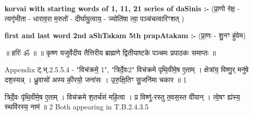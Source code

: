 \documentclass[17pt]{extarticle}
\begin{document}
        \textbf{korvai with starting words of 1, 11, 21 series of daSinis :-} \newline
        (प्रा॒णो र॑क्ष॒ - त्यगृ॑भीता - धाराव॒रा म॒रुतो॑ - दीर्घायु॒त्वाय॒ - ज्योति॑षा त्वा॒ पञ्च॑चत्वारिꣳशत् ) \newline

        \textbf{first and last  word 2nd aShTakam 5th prapAtakam :-} \newline
        (प्रा॒णः - शु॒नꣳ हु॑वेम) \newline 

       

        ॥ हरिः॑ ॐ ॥
॥ कृष्ण यजुर्वेदीय तैत्तिरीय ब्राह्मणे द्वितीयाष्टके पञ्चमः प्रपाठकः समाप्तः ॥

Appendix 
ट्.भ्.2.5.5.4 - "विच॑क्रमे॒ {1}", "त्रिर्दे॒वः{2}" 
विच॑क्रमे पृथि॒वीमे॒ष ए॒ताम् । क्षेत्रा॑य॒ विष्णु॒र् मनु॑षे दश॒स्यन्न् । 
ध्रु॒वासो॑ अस्य की॒रयो॒ जना॑सः । उ॒रु॒क्षि॒तिꣳ सु॒जनि॑मा चकार ॥ {1}

त्रिर्दे॒वः पृ॑थि॒वीमे॒ष ए॒ताम् । विच॑क्रमे श॒तर्च॑सं महि॒त्वा । 
प्र विष्णु॑-रस्तु त॒वस॒स्त वी॑यान् । त्वे॒षꣳ ह्य॑स्य॒ स्थवि॑रस्य॒ नाम॑ ॥ {2}
Both appearing in T.B.2.4.3.5 \newline
        \pagebreak
        
        
        
\end{document}
